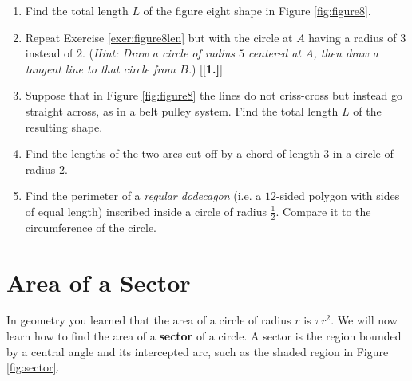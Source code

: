 {\begin{enumerate}[\bfseries 1.]
{}
 \item\label{exer:figure8len} Find the total length $L$ of the figure eight shape in Figure
  \ref{fig:figure8}.
 \item Repeat Exercise \ref{exer:figure8len} but with the circle at $A$ having a radius of $3$
  instead of $2$. (\emph{Hint: Draw a circle of radius $5$ centered at $A$, then draw a tangent
  line to that circle from $B$.})
[{[\bfseries 1.]}]
 \item Suppose that in Figure \ref{fig:figure8} the lines do not criss-cross but instead go
  straight across, as in a belt pulley system. Find the total length $L$ of the resulting shape.
 \item Find the lengths of the two arcs cut off by a chord of length $3$ in a circle of radius $2$.
 \item Find the perimeter of a \emph{regular dodecagon} (i.e. a $12$-sided polygon
  with sides of equal length) inscribed inside a circle of radius $\frac{1}{2}$. Compare it to the
  circumference of the circle.
\end{enumerate}}

\newpage
\section{Area of a Sector}
\piccaption[]{\label{fig:sector}}
In geometry you learned that the area of a circle of radius $r$ is $\pi r^2$. We will now learn
how to find the area of a \textbf{sector} of a circle. A sector
is the region bounded by a central angle and its intercepted arc, such as the shaded region in
Figure \ref{fig:sector}.

